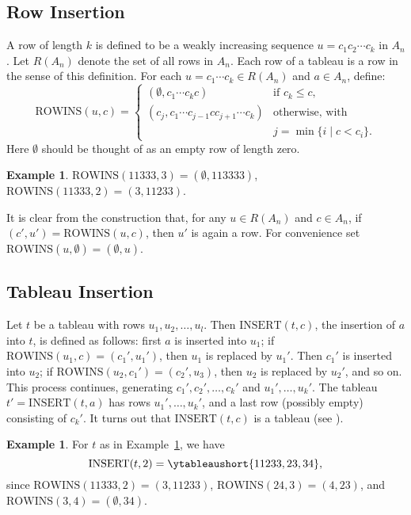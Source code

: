 \documentclass[12pt]{amsart}
\theoremstyle{definition}
\newtheorem{example}[theorem]{Example}
\newcommand{\rowins}{\mathrm{ROWINS}}
\newcommand{\ins}{\mathrm{INSERT}}
\begin{document}
\subsection{Row Insertion}
\label{sec:row-insertion}A row of length $k$ is defined to be a weakly increasing sequence $u=c_1c_2\dotsb c_k$ in $A_n$.
Let $R(A_n)$ denote the set of all rows in $A_n$.
Each row of a tableau is a row in the sense of this definition.
For each $u=c_1\dotsb c_k\in R(A_n)$ and $a\in A_n$, define:
\begin{displaymath}
  \rowins(u,c) =
  \begin{cases}
    (\emptyset, c_1\dotsb c_k c) & \text{if } c_k\leq c,\\
    (c_j,c_1\dotsb c_{j-1}cc_{j+1}\dotsb c_k) & \text{otherwise, with}\\
    & j=\min\{i\mid c<c_i\}.
  \end{cases}
\end{displaymath}
Here $\emptyset$ should be thought of as an empty row of length zero.
\begin{example}
  $\rowins(11333,3) = (\emptyset,113333)$, $\rowins(11333,2)=(3,11233)$.
\end{example}
It is clear from the construction that, for any $u\in R(A_n)$ and $c\in A_n$, if $(c',u')=\rowins(u,c)$, then $u'$ is again a row.
For convenience set $\rowins(u,\emptyset)=(\emptyset,u)$.
\subsection{Tableau Insertion}
\label{sec:tableau-insertion}
Let $t$ be a tableau with rows $u_1,u_2,\dotsc, u_l$.
Then $\ins(t,c)$, the insertion of $a$ into $t$, is defined as follows: first $a$ is inserted into $u_1$; if $\rowins(u_1,c)=(c_1',u_1')$, then $u_1$ is replaced by $u_1'$.
Then $c_1'$ is inserted into $u_2$; if $\rowins(u_2,c_1')=(c_2',u_3)$, then $u_2$ is replaced by $u_2'$, and so on.
This process continues, generating $c_1',c_2',\dotsc,c_k'$ and $u_1',\dotsc,u_k'$.
The tableau $t'=\ins(t,a)$ has rows $u_1',\dotsc,u_k'$, and a last row (possibly empty) consisting of $c_k'$.
It turns out that $\ins(t,c)$ is a tableau (see \cite{knuth}).
\begin{example}
  \label{example:insertion}
  For $t$ as in Example~\ref{example:insertion}, we have
  \begin{displaymath}
    \ins(t,2) = \ytableaushort{11233,23,34},
  \end{displaymath}
  since $\rowins(11333,2)=(3,11233)$, $\rowins(24,3)=(4,23)$, and $\rowins(3,4)=(\emptyset, 34)$.
\end{example}
\end{document}

